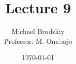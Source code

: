


\title{Lecture 9}
\date{\today}
\author{Michael Brodskiy\\ \small Professor: M. Onabajo}



\maketitle

